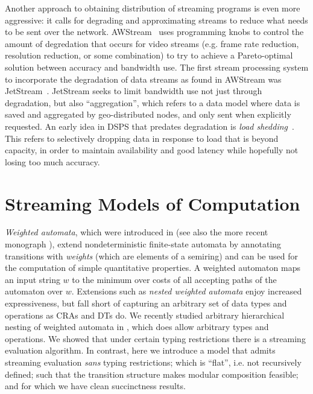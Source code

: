 Another approach to obtaining distribution of streaming programs is even more aggressive: it calls for degrading and approximating streams to reduce what needs to be sent over the network.
AWStream~\cite{zhang2018awstream} uses programming knobs to control the amount of degredation that occurs for video streams (e.g. frame rate reduction, resolution reduction, or some combination) to try to achieve a Pareto-optimal solution between accuracy and bandwidth use.
The first stream processing system to incorporate the degradation of data streams as found in AWStream was JetStream~\cite{rabkin2014jetstream}.
JetStream seeks to limit bandwidth use not just through degradation, but also ``aggregation'', which refers to a data model where data is saved and aggregated by geo-distributed nodes, and only sent when explicitly requested.
An early idea in DSPS that predates degradation is \emph{load shedding}~\cite{tatbul2003load,tatbul2007staying}.
This refers to selectively dropping data in response to load that is beyond capacity, in order to maintain availability and good latency while hopefully not losing too much accuracy.


\section{Streaming Models of Computation}


\emph{Weighted automata}, which were introduced in \cite{S1961WA} (see also the more recent monograph \cite{DKV2009HWA}), extend nondeterministic finite-state automata by annotating transitions with \emph{weights} (which are elements of a semiring) and can be used for the computation of simple quantitative properties. A weighted automaton maps an input string $w$ to the minimum over costs of all accepting paths of the automaton over $w$.
Extensions such as \emph{nested weighted automata} \cite{CHO2015NWA} enjoy increased expressiveness, but fall short of capturing an arbitrary set of data types and operations as CRAs and DTs do. We recently studied arbitrary hierarchical nesting of weighted automata in \cite{AMS2017SA}, which does allow arbitrary types and operations. We showed that under certain typing restrictions there is a streaming evaluation algorithm. In contrast, here we introduce a model that admits streaming evaluation \emph{sans} typing restrictions; which is ``flat'', i.e. not recursively defined; such that the transition structure makes modular composition feasible; and for which we have clean succinctness results.


